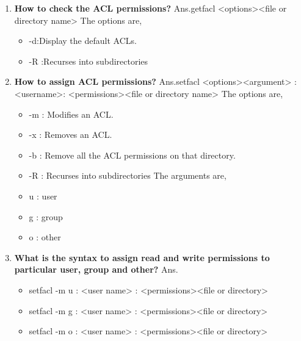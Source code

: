 \begin{enumerate}
    \bigskip
    \bigskip

    \item \textbf{How to check the ACL permissions?}
    \newline
    Ans.getfacl     <options><file  or  directory name>
    The options are,  \begin{itemize}
                        \item -d:Display the default ACLs.
                        \item -R :Recurses into subdirectories
                      \end{itemize}
    
    \bigskip
    \bigskip

    \item \textbf{How to assign ACL permissions?}
    \newline
    Ans.setfacl     <options><argument> : <username>: <permissions><file  or  directory name>
    The options are,  \begin{itemize}
                        \item -m :  Modifies an ACL.
                        \item -x :  Removes an ACL.
                        \item -b :  Remove all the ACL permissions on that directory.
                        \item -R : Recurses into subdirectories
   The arguments are,   \item  u : user
                        \item g : group
                        \item o : other
                      \end{itemize}    
    
    \bigskip
    \bigskip

    \item \textbf{What is the syntax to assign read and write permissions to particular user, group  and  other?}
    \newline
    Ans.\begin{itemize}
          \item setfacl    -m   u : <user name> : <permissions><file  or  directory>
          \item setfacl    -m   g : <user name> : <permissions><file  or  directory>
          \item setfacl    -m   o : <user name> : <permissions><file  or  directory>
        \end{itemize}


\end{enumerate}
